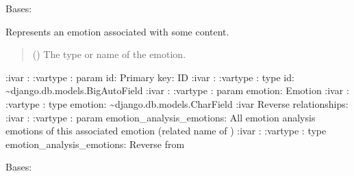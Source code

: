 \documentclass[letterpaper,10pt,english]{sphinxmanual}
\begin{document}

\begin{fulllineitems}
\label{\detokenize{source/meta_models_management:meta_models_management.models.AssociatedEmotion}}
\pysigstartsignatures
{}
\pysigstopsignatures
\sphinxAtStartPar
Bases: 

\sphinxAtStartPar
Represents an emotion associated with some content.
\begin{quote}\begin{description}
\sphinxAtStartPar
{} () \textendash{} The type or name of the emotion.

\end{description}\end{quote}

\sphinxAtStartPar
:ivar : 
:vartype : param id: Primary key: ID
:ivar : 
:vartype : type id: \textasciitilde{}django.db.models.BigAutoField
:ivar : 
:vartype : param emotion: Emotion
:ivar :
:vartype : type emotion: \textasciitilde{}django.db.models.CharField
:ivar Reverse relationships:
:ivar : 
:vartype : param emotion\_analysis\_emotions: All emotion analysis emotions of this associated emotion (related name of )
:ivar : 
:vartype : type emotion\_analysis\_emotions: Reverse  from {\hyperref[\detokenize{source/meta_models_management:meta_models_management.models.EmotionAnalysis}]{}}

\begin{fulllineitems}
\label{\detokenize{source/meta_models_management:meta_models_management.models.AssociatedEmotion.DoesNotExist}}
\pysigstartsignatures
{}
\pysigstopsignatures
\sphinxAtStartPar
Bases: 


\end{fulllineitems}
\end{fulllineitems}
\end{document}
